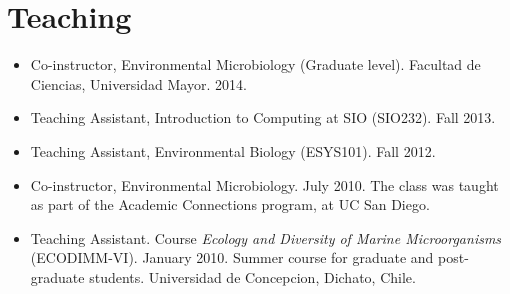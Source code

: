 \documentclass[10pt,letterpaper]{article}
\begin{document}
%
%

\section*{Teaching}

\begin{itemize}

\item Co-instructor, Environmental Microbiology (Graduate level). Facultad de Ciencias, Universidad Mayor. 2014.

\item Teaching Assistant, Introduction to Computing at SIO (SIO232). Fall 2013.

\item Teaching Assistant, Environmental Biology (ESYS101). Fall 2012.

\item Co-instructor, Environmental Microbiology. July 2010. The class was taught as part of the Academic Connections program, at UC San Diego.

\item Teaching Assistant. Course \textit{Ecology and Diversity of Marine Microorganisms} (ECODIMM-VI). January 2010. Summer course for graduate and post-graduate students. Universidad de Concepcion, Dichato, Chile.

\end{itemize}
\end{document}
